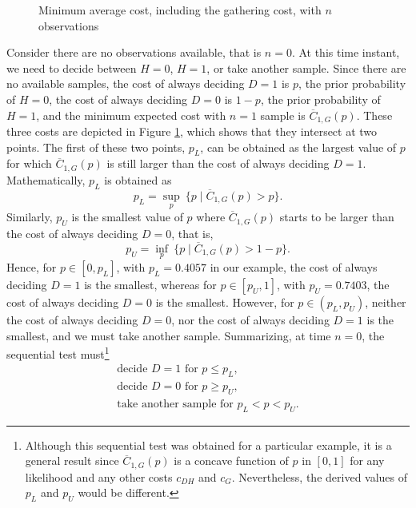 \begin{figure}[t]
	\begin{center}
		
	\end{center}
	\caption{Minimum average cost, including the gathering cost, with $n$ observations}
	\label{fig:average_cost3_n}
\end{figure}

Consider there are no observations available, that is $n = 0$. At this time instant, we need to decide between $H = 0$, $H = 1$, or take another sample. Since there are no available samples, the cost of always deciding $D = 1$ is $p$, the prior probability of $H = 0$, the cost of always deciding $D = 0$ is $1 - p$, the prior probability of $H = 1$, and the minimum expected cost with $n = 1$ sample is $\overline{C}_{1,G}(p)$. These three costs are depicted in Figure \ref{fig:average_cost3_n}, which shows that they intersect at two points. The first of these two points, $p_L$, can be obtained as the largest value of $p$ for which $\overline{C}_{1,G}(p)$ is still larger than the cost of always deciding $D = 1$. Mathematically, $p_L$ is obtained as
\begin{equation*}
	p_L = \sup_{p} \ \{p \mid \overline{C}_{1,G}(p) > p\}.
\end{equation*}
Similarly, $p_U$ is the smallest value of $p$ where $\overline{C}_{1,G}(p)$ starts to be larger than the cost of always deciding $D = 0$, that is,
\begin{equation*}
	p_U = \inf_{p} \  \{p \mid \overline{C}_{1,G}(p) > 1 - p\}.
\end{equation*}
Hence, for $p \in [0,p_L]$, with $p_L = 0.4057$ in our example, the cost of always deciding $D = 1$ is the smallest, whereas for $p \in [p_U,1]$, with $p_U = 0.7403$, the cost of always deciding $D = 0$ is the smallest. However, for $p \in (p_L,p_U)$, neither the cost of always deciding $D = 0$, nor the cost of always deciding $D = 1$ is the smallest, and we must take another sample. Summarizing, at time $n = 0$, the sequential test must\footnote{Although this sequential test was obtained for a particular example, it is a general result since $\overline{C}_{1,G}(p)$ is a concave function of $p$ in $[0,1]$ for any likelihood and any other costs $c_{DH}$ and $c_{G}$. Nevertheless, the derived values of $p_L$ and $p_U$ would be different.}
\begin{equation}
\label{eq:seq_test_n0}
\begin{array}{l}
	\text{decide } D = 1 \text{ for } p \leq p_L, \\
	\text{decide } D = 0 \text{ for } p \geq p_U, \\
	\text{take another sample for } p_L < p < p_U.
\end{array}
\end{equation}

